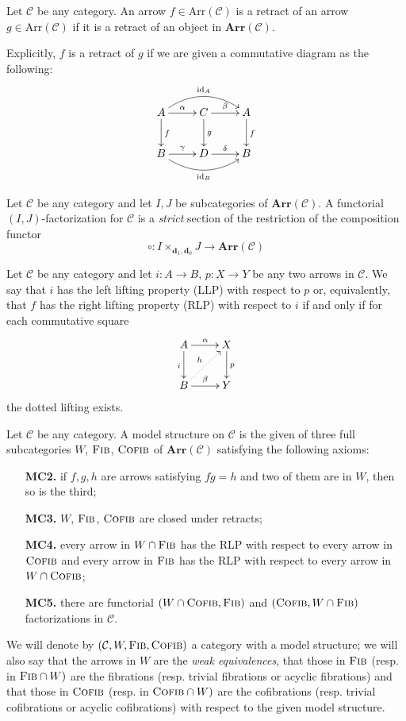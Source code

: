 \begin{defin}
Let $\mathcal C$ be any category. An arrow $f \in \mathrm{Arr}(\mathcal C)$ is a retract of an arrow $g \in \mathrm{Arr}(\mathcal C)$ if it is a retract of an object in $\mathbf{Arr}(\mathcal C)$. 
\end{defin}

Explicitly, $f$ is a retract of $g$ if we are given a commutative diagram as the following:
\[
\xymatrix{
A \ar@/^1.25pc/[rr]^{\mathrm{id}_A} \ar[d]^f \ar[r]^\alpha & C \ar[d]^g \ar[r]^\beta & A \ar[d]^f \\ B \ar[r]^\gamma \ar@/_1.2pc/[rr]_{\mathrm{id}_B} & D \ar[r]^\delta & B
}
\]

\begin{defin}
Let $\mathcal C$ be any category and let $I,J$ be subcategories of $\mathbf{Arr}(\mathcal C)$.
A functorial $(I,J)$-factorization for $\mathcal C$ is a \emph{strict} section of the restriction of the composition functor
\[
\circ \colon I \times_{\mathbf d_1,\mathbf d_0} J \to \mathbf{Arr}(\mathcal C)
\]
\end{defin}

\begin{defin}
Let $\mathcal C$ be any category and let $i \colon A \to B$, $p \colon X \to Y$ be any two arrows in $\mathcal C$. We say that $i$ has the left lifting property (LLP) with respect to $p$ or, equivalently, that $f$ has the right lifting property (RLP) with respect to $i$ if and only if for each commutative square
\[
\xymatrix{ A \ar[d]_i \ar[r]^\alpha & X \ar[d]^p \\ B \ar[r]^\beta \ar@{.>}[ur]^h & Y }
\]
the dotted lifting exists.
\end{defin}

\begin{defin}
Let $\mathcal C$ be any category. A model structure on $\mathcal C$ is the given of three full subcategories $W$, $\textsc{Fib}$, $\textsc{Cofib}$ of $\mathbf{Arr}(\mathcal C)$ satisfying the following axioms:
\begin{itemize}[leftmargin = 1.4 cm]
\item[{\bfseries MC2.}] if $f,g,h$ are arrows satisfying $fg = h$ and two of them are in $W$, then so is the third;
\item[{\bfseries MC3.}] $W$, $\textsc{Fib}$, $\textsc{Cofib}$ are closed under retracts;
\item[{\bfseries MC4.}] every arrow in $W \cap \textsc{Fib}$ has the RLP with respect to every arrow in $\textsc{Cofib}$ and every arrow in $\textsc{Fib}$ has the RLP with respect to every arrow in $W \cap \textsc{Cofib}$;
\item[{\bfseries MC5.}] there are functorial $(W \cap \textsc{Cofib}, \textsc{Fib})$ and $(\textsc{Cofib}, W \cap \textsc{Fib})$ factorizations in $\mathcal C$.
\end{itemize}
We will denote by $(\mathcal C, W,\textsc{Fib},\textsc{Cofib})$ a category with a model structure; we will also say that the arrows in $W$ are the \emph{weak equivalences}, that those in $\textsc{Fib}$ (resp. in $\textsc{Fib} \cap W)$ are the fibrations (resp. trivial fibrations or acyclic fibrations) and that those in $\textsc{Cofib}$ (resp. in $\textsc{Cofib} \cap W)$ are the cofibrations (resp. trivial cofibrations or acyclic cofibrations) with respect to the given model structure.
\end{defin}

